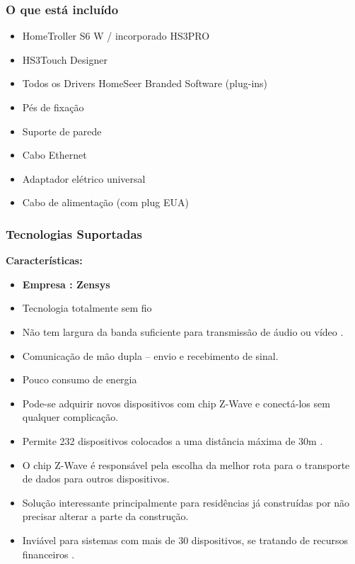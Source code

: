\subsubsection{O que está incluído}
\begin{itemize}
\item HomeTroller S6 W / incorporado HS3PRO
\item HS3Touch Designer
\item Todos os Drivers HomeSeer Branded Software (plug-ins)
\item Pés de fixação
\item Suporte de parede
\item Cabo Ethernet
\item Adaptador elétrico universal
\item Cabo de alimentação (com plug EUA)
\end{itemize}

\subsubsection{Tecnologias Suportadas}

\textbf{Características:}
\begin{itemize}
\item \textbf{Empresa : Zensys}
\item Tecnologia totalmente sem fio
\item Não tem largura da banda suficiente para transmissão de áudio ou vídeo \cite{PrincipaisTeruelFilho}.
\item Comunicação de mão dupla – envio e recebimento de sinal.
\item Pouco consumo de energia
\item Pode-se adquirir novos dispositivos com chip Z-Wave e conectá-los sem qualquer complicação.
\item Permite 232 dispositivos colocados a uma distância máxima de 30m \cite{PrincipaisTeruelFilho}.
\item O chip Z-Wave é responsável pela escolha da melhor rota para o transporte de dados para outros dispositivos.
\item Solução interessante principalmente para residências já construídas por não precisar alterar a parte da construção.
\item Inviável para sistemas com mais de 30 dispositivos, se tratando de recursos financeiros \cite{PrincipaisTeruelFilho}.
\end{itemize}

